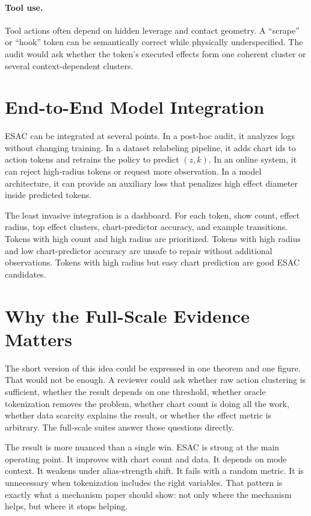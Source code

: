 \documentclass{article}
\begin{document}
\paragraph{Tool use.}
Tool actions often depend on hidden leverage and contact geometry. A ``scrape''
or ``hook'' token can be semantically correct while physically underspecified.
The audit would ask whether the token's executed effects form one coherent
cluster or several context-dependent clusters.

\section{End-to-End Model Integration}

ESAC can be integrated at several points. In a post-hoc audit, it analyzes logs
without changing training. In a dataset relabeling pipeline, it adds chart ids
to action tokens and retrains the policy to predict $(z,k)$. In an online
system, it can reject high-radius tokens or request more observation. In a model
architecture, it can provide an auxiliary loss that penalizes high effect
diameter inside predicted tokens.

The least invasive integration is a dashboard. For each token, show count,
effect radius, top effect clusters, chart-predictor accuracy, and example
transitions. Tokens with high count and high radius are prioritized. Tokens
with high radius and low chart-predictor accuracy are unsafe to repair without
additional observations. Tokens with high radius but easy chart prediction are
good ESAC candidates.

\section{Why the Full-Scale Evidence Matters}

The short version of this idea could be expressed in one theorem and one
figure. That would not be enough. A reviewer could ask whether raw action
clustering is sufficient, whether the result depends on one threshold, whether
oracle tokenization removes the problem, whether chart count is doing all the
work, whether data scarcity explains the result, or whether the effect metric
is arbitrary. The full-scale suites answer those questions directly.

The result is more nuanced than a single win. ESAC is strong at the main
operating point. It improves with chart count and data. It depends on mode
context. It weakens under alias-strength shift. It fails with a random metric.
It is unnecessary when tokenization includes the right variables. That pattern
is exactly what a mechanism paper should show: not only where the mechanism
helps, but where it stops helping.
\end{document}
